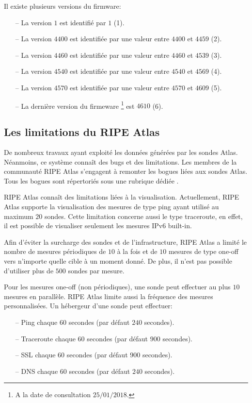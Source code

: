 Il existe plusieurs versions du firmware:
\begin{itemize}
	\setlength\itemsep{0.1 cm}
	\item[--] La version $1$ est identifié par  $1$ (1). 
	\item[--] La version $4400$  est identifiée par une valeur entre  $4400$ et $4459$ (2).
	\item[--]  La version $4460$ est identifiée par une valeur entre $4460$ et $4539$ (3).
	\item[--]  La version $4540$  est identifiée par une valeur entre  $4540$ et $4569$ (4).
	\item[--]  La version $4570$  est identifiée par une valeur entre $4570$ et $4609$ (5).
	\item[--] La dernière version du firmeware \footnote{A la date de consultation $ 25/01/2018 $.} est $4610$ (6). 
\end{itemize}

\subsection{Les limitations du RIPE Atlas}


De nombreux travaux ayant exploité les données générées par les sondes Atlas. Néanmoins, ce système connaît des bugs et des limitations. Les membres de la communauté RIPE Atlas s'engagent à remonter les bogues liées aux sondes Atlas. Tous les bogues sont répertoriés sous une rubrique dédiée  \cite{bugs-ripe-atlas}.

RIPE Atlas connaît des limitations  liées à la visualisation. Actuellement, RIPE Atlas supporte la visualisation des mesures de type ping ayant utilisé au maximum $20$  sondes. Cette limitation concerne aussi le type traceroute, en effet,  il est possible de visualiser seulement les mesures IPv6 built-in.

Afin d'éviter la surcharge  des sondes et de l'infrastructure, RIPE Atlas a limité le nombre de mesures périodiques de $10$ à la fois et de $10$ mesures de type one-off vers n'importe quelle cible à un moment donné. De plus, il n'est pas possible d'utiliser  plus de $500$ sondes par mesure.

Pour les mesures one-off (non périodiques), une sonde peut effectuer au plus $10$ mesures en parallèle. RIPE Atlas limite aussi la fréquence des mesures personnalisées. Un hébergeur d'une sonde peut effectuer:

\begin{itemize}
	\item[--] Ping chaque $60$ secondes (par défaut  $240$ secondes).
	\item[--] Traceroute chaque $60$ secondes (par défaut  $900$ secondes).
	\item[--] SSL chaque $60$ secondes (par défaut  $900$ secondes).
	\item[--] DNS chaque $60$ secondes (par défaut $240$ secondes).
	
\end{itemize}

